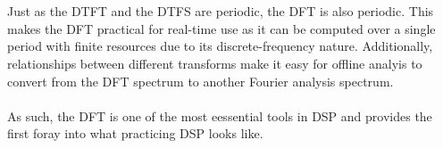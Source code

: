 \documentclass{report}
\begin{document}
\begin{figure}[!hbt]
\begin{center}
    \end{center}
    \begin{center}
    \end{center}
\end{figure}
\\ \\
Just as the DTFT and the DTFS are periodic, the DFT is also periodic. This makes the DFT practical for real-time use as it can be computed over a single period 
with finite resources due to its discrete-frequency nature. Additionally, relationships between different transforms make it easy for offline analyis to convert from 
the DFT spectrum to another Fourier analysis spectrum.
\\ \\
As such, the DFT is one of the most eessential tools in DSP and provides the first foray into what practicing DSP looks like.
\end{document}
